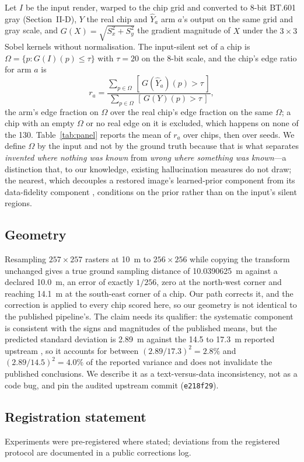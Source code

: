 Let $I$ be the input render, warped to the chip grid and converted to 8-bit BT.601 gray (Section~II-D),
$Y$ the real chip and $\hat{Y}_a$ arm $a$'s output on the same grid and gray scale, and
$G(X) = \sqrt{S_x^2 + S_y^2}$ the gradient magnitude of $X$ under the $3\times3$ Sobel
kernels without normalisation. The input-silent set of a chip is
$\Omega = \{p : G(I)(p) \le \tau\}$ with $\tau = 20$ on the 8-bit scale, and the chip's
edge ratio for arm $a$ is
\begin{equation}
r_a = \frac{\sum_{p\in\Omega}\,[\,G(\hat{Y}_a)(p) > \tau\,]}{\sum_{p\in\Omega}\,[\,G(Y)(p) > \tau\,]},
\label{eq:edge}
\end{equation}
the arm's edge fraction on $\Omega$ over the real chip's edge fraction on the same
$\Omega$; a chip with an empty $\Omega$ or no real edge on it is excluded, which happens
on none of the 130. Table~\ref{tab:panel} reports the mean of $r_a$ over chips, then over
seeds. We define $\Omega$ by the input and not by the ground truth because that is what separates
\emph{invented where nothing was known} from \emph{wrong where something was known}---a distinction that, to our knowledge, existing hallucination measures do not draw; the
nearest, which decouples a restored image's learned-prior component from its data-fidelity
component \cite{elhelou2022bigprior}, conditions on the prior rather than on the input's
silent regions.

\subsection{Geometry}

Resampling $257\times257$ rasters at 10~m to $256\times256$ while copying the transform
unchanged gives a true ground sampling distance of 10.0390625~m against a declared 10.0~m,
an error of exactly $1/256$, zero at the north-west corner and reaching 14.1~m at the
south-east corner of a chip. Our path corrects it, and the correction is applied to every
chip scored here, so our geometry is not identical to the published pipeline's. The claim needs its qualifier: the systematic component is consistent with the signs
and magnitudes of the published means, but the predicted standard deviation is 2.89~m against the 14.5 to 17.3~m reported
upstream \cite{guasch2026gencp}, so it accounts for between $(2.89/17.3)^2 = 2.8\%$
and $(2.89/14.5)^2 = 4.0\%$ of the reported variance and does not invalidate the
published conclusions. We describe it as a
text-versus-data inconsistency, not as a code bug, and pin the audited upstream commit
(\texttt{e218f29}).

\subsection{Registration statement}

Experiments were pre-registered where stated; deviations from the registered
protocol are documented in a public corrections log.
